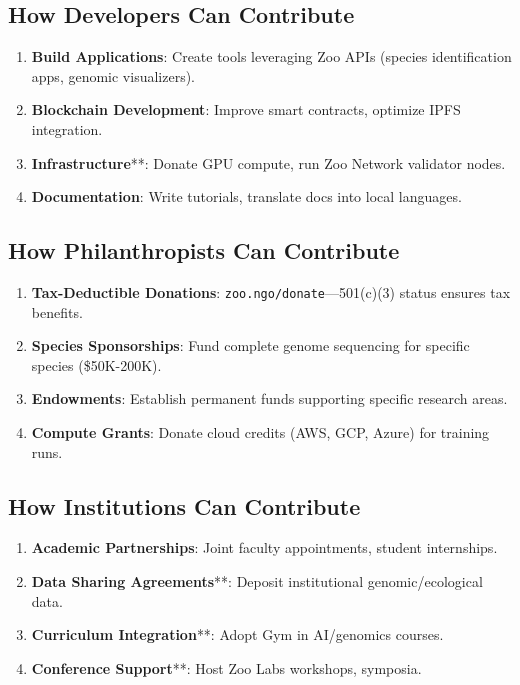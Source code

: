 \documentclass[twocolumn,11pt]{article}
\begin{document}
\subsection{How Developers Can Contribute}

\begin{enumerate}
    \item \textbf{Build Applications}: Create tools leveraging Zoo APIs (species identification apps, genomic visualizers).
    \item \textbf{Blockchain Development}: Improve smart contracts, optimize IPFS integration.
    \item \textbf{Infrastructure}**: Donate GPU compute, run Zoo Network validator nodes.
    \item \textbf{Documentation}: Write tutorials, translate docs into local languages.
\end{enumerate}

\subsection{How Philanthropists Can Contribute}

\begin{enumerate}
    \item \textbf{Tax-Deductible Donations}: \texttt{zoo.ngo/donate}—501(c)(3) status ensures tax benefits.
    \item \textbf{Species Sponsorships}: Fund complete genome sequencing for specific species (\$50K-200K).
    \item \textbf{Endowments}: Establish permanent funds supporting specific research areas.
    \item \textbf{Compute Grants}: Donate cloud credits (AWS, GCP, Azure) for training runs.
\end{enumerate}

\subsection{How Institutions Can Contribute}

\begin{enumerate}
    \item \textbf{Academic Partnerships}: Joint faculty appointments, student internships.
    \item \textbf{Data Sharing Agreements}**: Deposit institutional genomic/ecological data.
    \item \textbf{Curriculum Integration}**: Adopt Gym in AI/genomics courses.
    \item \textbf{Conference Support}**: Host Zoo Labs workshops, symposia.
\end{enumerate}
\end{document}
